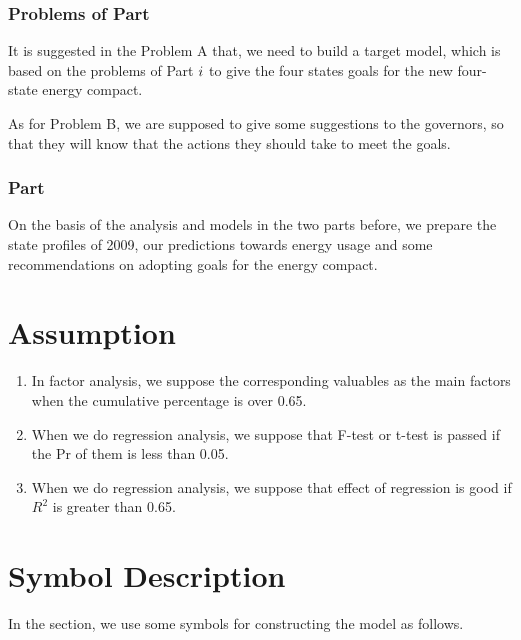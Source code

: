 \documentclass[a4paper,11pt]{article}
\begin{document}
\subsubsection{Problems of Part \uppercase\expandafter{}}
\par It is suggested in the Problem A that, we need to build a target model, which is based on the problems of Part $\uppercase\expandafter{\romannumeral1}$ to give the four states goals for the new four-state energy compact.

\par As for Problem B, we are supposed to give some suggestions to the governors, so that they will know that the actions they should take to meet the goals.

\subsubsection{Part \uppercase\expandafter{}}
\par On the basis of the analysis and models in the two parts before, we prepare the state profiles of 2009, our predictions towards energy usage and some recommendations on adopting goals for the energy compact.


\section{Assumption}
\begin{enumerate}%
\renewcommand{\labelenumi}{(\theenumi)}
    \item In factor analysis, we suppose the corresponding valuables as the main factors when the cumulative percentage is over 0.65.
    \item When we do regression analysis, we suppose that F-test or t-test is passed if the Pr of them is less than 0.05.
    \item When we do regression analysis, we suppose that effect of regression is good if $R^{2}$ is greater than 0.65.
\end{enumerate}



\section{Symbol Description}
In the section, we use some symbols for constructing the model as follows.
\end{document}
